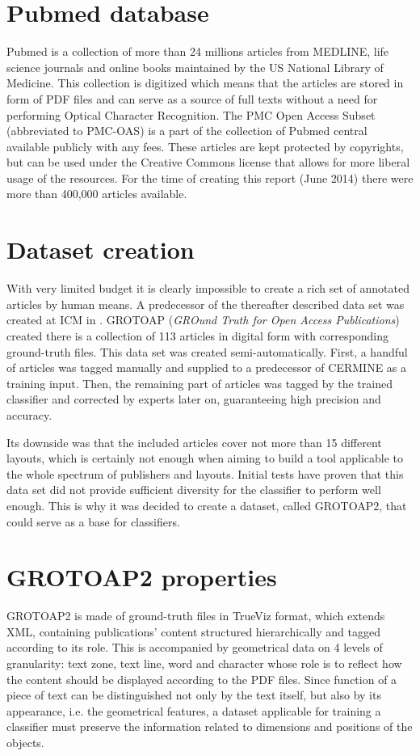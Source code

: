 \section{Pubmed database}
Pubmed \cite{Pubmed} is a collection of more than 24 millions articles from MEDLINE, life science journals and online books maintained by the US National Library of Medicine. This collection is digitized which means that the articles are stored in form of PDF files and can serve as a source of full texts without a need for performing Optical Character Recognition. 
The PMC Open Access Subset (abbreviated to PMC-OAS) is a part of the collection of Pubmed central available publicly with any fees. These articles are kept protected by copyrights, but can be used under the Creative Commons license that allows for more liberal usage of the resources. For the time of creating this report (June 2014) there were more than 400,000 articles available.
\section{Dataset creation}
With very limited budget it is clearly impossible to create a rich set of annotated articles by human means. A predecessor of the thereafter described data set was created at ICM in \cite{Tkaczyk2012}. GROTOAP (\textit{GROund Truth for Open Access Publications}) created there is a collection of 113 articles in digital form with corresponding ground-truth files. This data set was created semi-automatically. First, a handful of articles was tagged manually and supplied to a predecessor of CERMINE as a training input. Then, the remaining part of articles was tagged by the trained classifier and corrected by experts later on, guaranteeing high precision and accuracy.

Its downside was that the included articles cover not more than 15 different layouts, which is certainly not enough when aiming to build a tool applicable to the whole spectrum of publishers and layouts. Initial tests have proven that this data set did not provide sufficient diversity for the classifier to perform well enough. This is why it was decided to create a dataset, called GROTOAP2, that could serve as a base for classifiers.

\section{GROTOAP2 properties}
GROTOAP2 is made of ground-truth files in TrueViz format, which extends XML, containing publications' content structured hierarchically and tagged according to its role. This is accompanied by geometrical data on 4 levels of granularity: text zone, text line, word and character whose role is to reflect how the content should be displayed according to the PDF files. Since function of a piece of text can be distinguished not only by the text itself, but also by its appearance, i.e. the geometrical features, a dataset applicable for training a classifier must preserve the information related to dimensions and positions of the objects.

